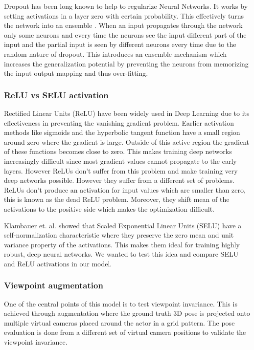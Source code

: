 Dropout \parencite{srivastava2014dropout} has been long known to help to regularize Neural Networks. It works by setting activations in a layer zero with certain probability. This effectively turns the network into an ensemble \parencite{hara2016analysis}. When an input propagates through the network only some neurons and every time the neurons see the input different part of the input and the partial input is seen by different neurons every time due to the random nature of dropout. This introduces an ensemble mechanism which increases the generalization potential by preventing the neurons from memorizing the input output mapping and thus over-fitting. 

\subsubsection{ReLU vs SELU activation}

Rectified Linear Units (ReLU) \parencite{nair2010rectified} have been widely used in Deep Learning due to its effectiveness in preventing the vanishing gradient problem. Earlier activation methods like sigmoids and the hyperbolic tangent function have a small region around zero where the gradient is large. Outside of this active region the gradient of these functions becomes close to zero. This makes training deep networks increasingly difficult since most gradient values cannot propagate to the early layers. However ReLUs don't suffer from this problem and make training very deep networks possible. However they suffer from a different set of problems. ReLUs don't produce an activation for input values which are smaller than zero, this is known as the dead ReLU problem. Moreover, they shift mean of the activations to the positive side which makes the optimization difficult. 

Klambauer et. al. \parencite{klambauer2017self} showed that Scaled Exponential Linear Units (SELU) have a self-normalization characteristic where they preserve the zero mean and unit variance property of the activations. This makes them ideal for training highly robust, deep neural networks. We wanted to test this idea and compare SELU and ReLU activations in our model.

\subsubsection{Viewpoint augmentation}

One of the central points of this model is to test viewpoint invariance. This is achieved through augmentation where the ground truth 3D pose is projected onto multiple virtual cameras placed around the actor in a grid pattern. The pose evaluation is done from a different set of virtual camera positions to validate the viewpoint invariance. %

